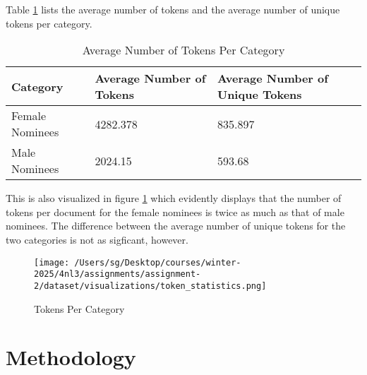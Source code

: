 \documentclass[titlepage]{article}
\begin{document}
Table \ref{tab:tokens} lists the average number of tokens and the average number of unique tokens per category.

\begin{table}[H] \label{tab:tokens}
    \centering
    \begin{tabular}{lll}
    \toprule
    \textbf{Category} & \textbf{Average Number of Tokens} & \textbf{Average Number of Unique Tokens}\\
    \midrule
    Female Nominees & 4282.378 & 835.897 \\
    Male Nominees & 2024.15 & 593.68 \\
    \bottomrule
    \end{tabular}
    \caption{Average Number of Tokens Per Category}
\end{table}

This is also visualized in figure \ref{fig:tokens} which evidently displays that the number of tokens per document for the female 
nominees is twice as much as that of male nominees. The difference between the average number of unique tokens for the two categories 
is not as sigficant, however.

\begin{figure}[H]\label{fig:tokens}
    \centering
    \texttt{[image: /Users/sg/Desktop/courses/winter-2025/4nl3/assignments/assignment-2/dataset/visualizations/token\_statistics.png]}
    \caption{Tokens Per Category}
\end{figure}
 
\section{Methodology}
\end{document}

